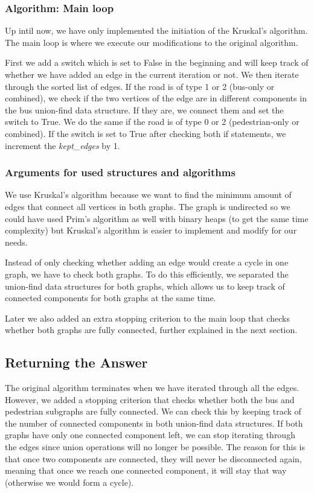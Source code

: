 \documentclass[a4paper]{article}
\begin{document}
\subsubsection*{Algorithm: Main loop}
Up intil now, we have only implemented the initiation of the Kruskal's algorithm. The main loop is where we execute our modifications to the original algorithm.

First we add a switch which is set to False in the beginning and will keep track of whether we have added an edge in the current iteration or not. We then iterate through the sorted list of edges. If the road is of type 1 or 2 (bus-only or combined), we check if the two vertices of the edge are in different components in the bus union-find data structure. If they are, we connect them and set the switch to True. We do the same if the road is of type 0 or 2 (pedestrian-only or combined). If the switch is set to True after checking both if statements, we increment the \textsl{kept\_edges} by 1.

\subsubsection*{Arguments for used structures and algorithms}
We use Kruskal's algorithm because we want to find the minimum amount of edges that connect all vertices in both graphs. The graph is undirected so we could have used Prim's algorithm as well with binary heaps (to get the same time complexity) but Kruskal's algorithm is easier to implement and modify for our needs. 

Instead of only checking whether adding an edge would create a cycle in one graph, we have to check both graphs. To do this efficiently, we separated the union-find data structures for both graphs, which allows us to keep track of connected components for both graphs at the same time.

Later we also added an extra stopping criterion to the main loop that checks whether both graphs are fully connected, further explained in the next section.

\subsection{Returning the Answer}
The original algorithm terminates when we have iterated through all the edges. However, we added a stopping criterion that checks whether both the bus and pedestrian subgraphs are fully connected. We can check this by keeping track of the number of connected components in both union-find data structures. If both graphs have only one connected component left, we can stop iterating through the edges since union operations will no longer be possible. The reason for this is that once two components are connected, they will never be disconnected again, meaning that once we reach one connected component, it will stay that way (otherwise we would form a cycle).
\end{document}
